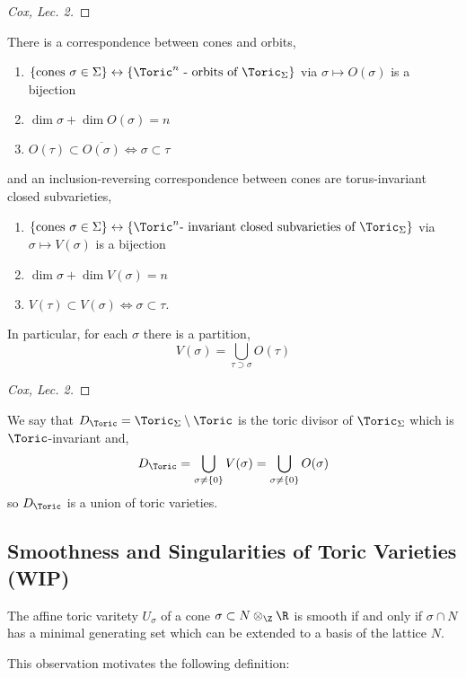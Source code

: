 \documentclass[12pt]{article}
\begin{document}
\begin{proof}
[Cox, Lec. 2]
\end{proof}

\begin{theorem}
There is a correspondence between cones and orbits,
\begin{enumerate}
\item $\{ \text{cones } \sigma \in \Sigma \} \leftrightarrow \{ \Toric^n \text{ - orbits of } \Toric_\Sigma \}$ via $\sigma \mapsto O(\sigma)$ is a bijection
\item $\dim{\sigma} + \dim{O(\sigma)} = n$
\item $O(\tau) \subset \overline{O(\sigma)} \iff \sigma \subset \tau$
\end{enumerate}
and an inclusion-reversing correspondence between cones are torus-invariant closed subvarieties,
\begin{enumerate}
\item $\{ \text{cones } \sigma \in \Sigma \} \leftrightarrow \{ \Toric^n \text{- invariant closed subvarieties of } \Toric_\Sigma \}$ via $\sigma \mapsto V(\sigma)$ is a bijection
\item $\dim{\sigma} + \dim{V(\sigma)} = n$
\item $V(\tau) \subset V(\sigma) \iff \sigma \subset \tau$.
\end{enumerate}
In particular, for each $\sigma$ there is a partition,
\[ V(\sigma) = \bigcup_{\tau \supset \sigma} O(\tau) \]
\end{theorem}

\begin{proof}
[Cox, Lec. 2]
\end{proof}

\begin{rmk}
We say that $D_\Toric = \Toric_\Sigma \setminus \Toric$ is the toric divisor of $\Toric_\Sigma$ which is $\Toric$-invariant and,
\[ D_\Toric = \bigcup_{\sigma \neq \{0\}} V(\sigma) = \bigcup_{\sigma \neq \{0\}} O(\sigma) \]
so $D_\Toric$ is a union of toric varieties.
\end{rmk}


\subsection{Smoothness and Singularities of Toric Varieties (WIP)}

\begin{lemma}
The affine toric varitety $U_\sigma$ of a cone $\sigma \subset N \otimes_\Z \R$ is smooth if and only if $\sigma \cap N$ has a minimal generating set which can be extended to a basis of the lattice $N$.
\end{lemma}
\noindent
This observation motivates the following definition:
\end{document}
